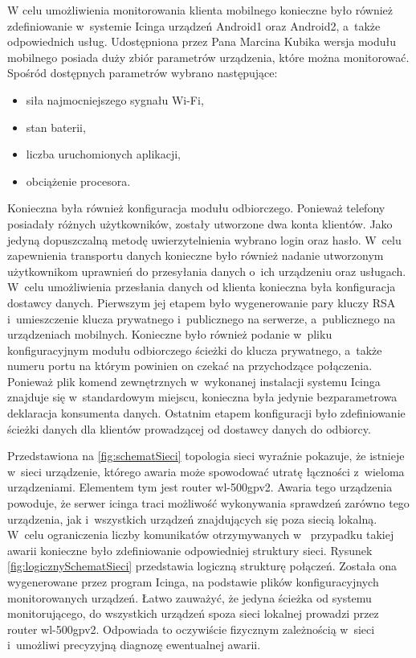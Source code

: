 W celu umożliwienia monitorowania klienta mobilnego konieczne było
również zdefiniowanie w~systemie Icinga urządzeń Android1 oraz
Android2, a~także odpowiednich usług. Udostępniona przez Pana Marcina
Kubika wersja modułu mobilnego posiada duży zbiór parametrów
urządzenia, które można monitorować. Spośród dostępnych parametrów
wybrano następujące:

\begin{itemize}
\item siła najmocniejszego sygnału Wi-Fi,
\item stan baterii,
\item liczba uruchomionych aplikacji,
\item obciążenie procesora.
\end{itemize}

Konieczna była również konfiguracja modułu odbiorczego. Ponieważ
telefony posiadały różnych użytkowników, zostały utworzone dwa konta
klientów. Jako jedyną dopuszczalną metodę uwierzytelnienia wybrano
login oraz hasło. W~celu zapewnienia transportu danych konieczne było
również nadanie utworzonym użytkownikom uprawnień do przesyłania
danych o~ich urządzeniu oraz usługach. W~celu umożliwienia przesłania
danych od klienta konieczna była konfiguracja dostawcy
danych. Pierwszym jej etapem było wygenerowanie pary kluczy RSA
i~umieszczenie klucza prywatnego i~publicznego na serwerze,
a~publicznego na urządzeniach mobilnych. Konieczne było również
podanie w~pliku konfiguracyjnym modułu odbiorczego ścieżki do klucza
prywatnego, a~także numeru portu na którym powinien on czekać na
przychodzące połączenia. Ponieważ plik komend zewnętrznych w~wykonanej
instalacji systemu Icinga znajduje się w~standardowym miejscu,
konieczna była jedynie bezparametrowa deklaracja konsumenta
danych. Ostatnim etapem konfiguracji było zdefiniowanie ścieżki danych
dla klientów prowadzącej od dostawcy danych do odbiorcy.

Przedstawiona na \ref{fig:schematSieci} topologia sieci wyraźnie
pokazuje, że istnieje w~sieci urządzenie, którego awaria może
spowodować utratę łączności z~wieloma urządzeniami. Elementem tym jest
router wl-500gpv2. Awaria tego urządzenia powoduje, że serwer icinga
traci możliwość wykonywania sprawdzeń zarówno tego urządzenia, jak
i~wszystkich urządzeń znajdujących się poza siecią lokalną. W~celu
ograniczenia liczby komunikatów otrzymywanych w ~przypadku takiej
awarii konieczne było zdefiniowanie odpowiedniej struktury
sieci. Rysunek \ref{fig:logicznySchematSieci} przedstawia logiczną
strukturę połączeń. Została ona wygenerowane przez program Icinga, na
podstawie plików konfiguracyjnych monitorowanych urządzeń. Łatwo
zauważyć, że jedyna ścieżka od systemu monitorującego, do wszystkich
urządzeń spoza sieci lokalnej prowadzi przez router
wl-500gpv2. Odpowiada to oczywiście fizycznym zależnością w~sieci
i~umożliwi precyzyjną diagnozę ewentualnej awarii.

